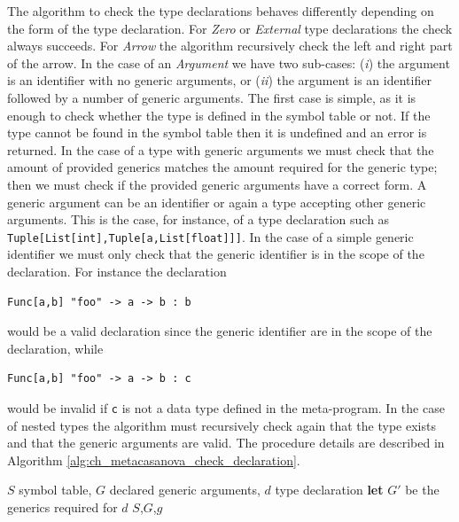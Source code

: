 The algorithm to check the type declarations behaves differently depending on the form of the type declaration. For \textit{Zero} or \textit{External} type declarations the check always succeeds. For \textit{Arrow} the algorithm recursively check the left and right part of the arrow. In the case of an \textit{Argument} we have two sub-cases: (\textit{i}) the argument is an identifier with no generic arguments, or (\textit{ii}) the argument is an identifier followed by a number of generic arguments. The first case is simple, as it is enough to check whether the type is defined in the symbol table or not. If the type cannot be found in the symbol table then it is undefined and an error is returned. In the case of a type with generic arguments we must check that the amount of provided generics matches the amount required for the generic type; then we must check if the provided generic arguments have a correct form. A generic argument can be an identifier or again a type accepting other generic arguments. This is the case, for instance, of a type declaration such as \texttt{Tuple[List[int],Tuple[a,List[float]]]}. In the case of a simple generic identifier we must only check that the generic identifier is in the scope of the declaration. For instance the declaration

\begin{lstlisting}
Func[a,b] "foo" -> a -> b : b
\end{lstlisting}

\noindent
would be a valid declaration since the generic identifier are in the scope of the declaration, while

\begin{lstlisting}
Func[a,b] "foo" -> a -> b : c
\end{lstlisting}

\noindent
would be invalid if \texttt{c} is not a data type defined in the meta-program. In the case of nested types the algorithm must recursively check again that the type exists and that the generic arguments are valid. The procedure details are described in Algorithm \ref{alg:ch_metacasanova_check_declaration}.

\begin{algorithm}
	\caption{Type checking of a symbol declaration}
	\label{alg:ch_metacasanova_check_declaration}
	\begin{algorithmic}
		 {$S$ symbol table, $G$ declared generic arguments, $d$ type declaration}
				\State \Return
			\Else
				\State \textbf{let} $G'$ be the generics required for $d$
					\Else
							\State {} {$S$,$G$,$g$}
						\EndFor
					\EndIf
				\Else
						\State \Return
					\Else
					\EndIf
				\EndIf
			\EndIf
		\EndFunction
	\end{algorithmic}
\end{algorithm}

